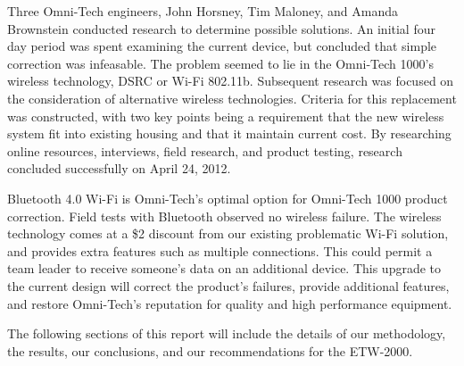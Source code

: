 \documentclass[11pt]{article}
\begin{document}
Three Omni-Tech engineers, John Horsney, Tim Maloney, and Amanda Brownstein conducted
research to determine possible solutions. An initial four day period was spent
examining the current device, but concluded that simple correction was infeasable.
The problem seemed to lie in the Omni-Tech 1000's wireless technology, DSRC or Wi-Fi
802.11b. Subsequent research was focused on the consideration of alternative wireless
technologies. Criteria for this replacement was constructed, with two key points
being a requirement that the new wireless system fit into existing housing and
that it maintain current cost. By researching online resources, interviews,
field research, and product testing, research concluded successfully on April 24, 2012.

Bluetooth 4.0 Wi-Fi is Omni-Tech's optimal option for Omni-Tech 1000 product correction.
Field tests with Bluetooth observed no wireless failure. The wireless technology
comes at a \$2 discount from our existing problematic Wi-Fi solution, and provides
extra features such as multiple connections. This could permit a team leader to
receive someone’s data on an additional device. This upgrade to the current design
will correct the product's failures, provide additional features, and restore Omni-Tech's
reputation for quality and high performance equipment.

The following sections of this report will include the details of our methodology,
the results, our conclusions, and our recommendations for the ETW-2000.
\end{document}
